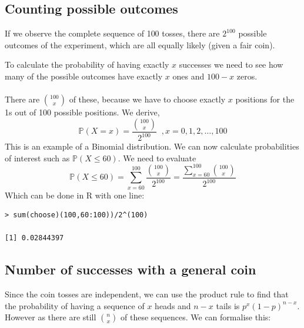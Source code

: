 \documentclass{report}
\theoremstyle{definition}
\newtheorem{definition}{Definition}
\theoremstyle{plain}
\theoremstyle{remark}
\begin{document}
\subsection{Counting possible outcomes}
If we observe the complete sequence of 100 tosses, there are $ 2^{100}
$ possible outcomes of the experiment, which are all equally likely (given
a fair coin).
\par To calculate the probability of having exactly $ x $ successes we need to
see how many of the possible outcomes have exactly $ x $ ones and $ 100
- x $ zeros. 
\\\\
There are $ \displaystyle {100 \choose x} $ of these, because we have to choose
exactly $ x $ positions for the 1s out of 100 possible positions.
We derive,
$$ \mathbb{P}(X=x) = \frac{\displaystyle {100\choose x}}{\displaystyle 2^{100}}
\;\; , x = 0,1,2, \dots, 100$$
This is an example of a Binomial distribution. We can now calculate
probabilities of interest such as $ \mathbb{P}(X \leq 60) $. We need to
evaluate
$$ \mathbb{P} (X \leq 60) = \displaystyle \sum_{x=60}^{100} \frac{\displaystyle
{100\choose x}}{2^{100}} = \frac{ \displaystyle \sum_{x=60}^{100} {100 \choose
x}}{2^{100}} $$
Which can be done in R with one line:
\begin{lstlisting}
> sum(choose)(100,60:100))/2^(100)

[1] 0.02844397
\end{lstlisting}

\subsection{Number of successes with a general coin}
Since the coin tosses are independent, we can use the product rule to find that
the probability of having a sequence of $ x $ heads and $ n-x $ tails is
$ p^x(1-p)^{n-x} $. However as there are still $ {n\choose x} $ of these
sequences. We can formalise this:

\begin{center}
\end{center}
\end{document}
